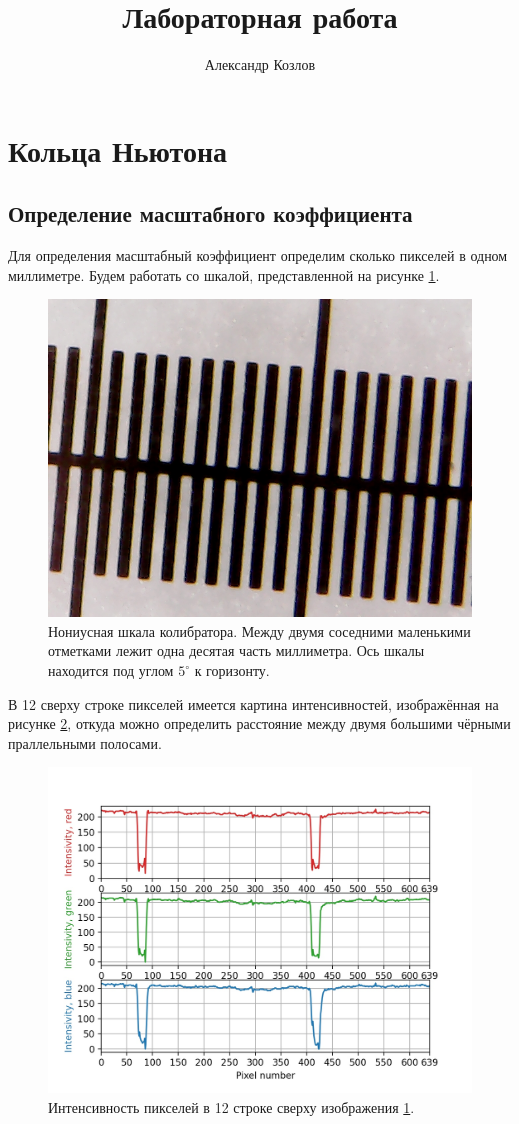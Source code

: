 \documentclass[12pt]{article}
\title{Лабораторная работа}
\author{Александр Козлов}
\begin{document}
\maketitle

\section{Кольца Ньютона}
\subsection{Определение масштабного коэффициента}
Для определения масштабный коэффициент определим сколько пикселей в одном миллиметре. Будем работать со шкалой, представленной на рисунке \ref{fig:1}. 
\begin{figure}[htbp]
	\centering
	\includegraphics[width = 0.5\linewidth]{../data/1-0.jpg}
	\caption{Нониусная шкала колибратора. Между двумя соседними маленькими отметками лежит одна десятая часть миллиметра. Ось шкалы находится под углом $5^\circ$ к горизонту.}
	\label{fig:1}
\end{figure}
В 12 сверху строке пикселей имеется картина интенсивностей, изображённая на рисунке \ref{fig:2}, откуда можно определить расстояние между двумя большими чёрными праллельными полосами.
\begin{figure}[htbp]
	\centering
	\includegraphics[scale = 1]{../plots/1-0.jpg}
	\caption{Интенсивность пикселей в 12 строке сверху изображения \ref{fig:1}.}
	\label{fig:2}
\end{figure}
\end{document}
